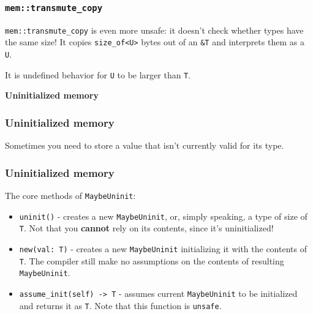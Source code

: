 \documentclass[aspectratio=1610,t]{beamer}
\begin{document}

\begin{frame}[fragile]
\frametitle{\texttt{mem::transmute\_copy}}
\texttt{mem::transmute\_copy} is even more unsafe: it doesn't check whether types have the same size! It copies \texttt{size\_of<U>} bytes out of an \texttt{\&T} and interprets them as a \texttt{U}.

It is undefined behavior for \texttt{U} to be larger than \texttt{T}.
\end{frame}


\begin{frame}[c]
\centering\Huge\textbf{Uninitialized memory}
\end{frame}


\begin{frame}[fragile]
\frametitle{Uninitialized memory}
Sometimes you need to store a value that isn't currently valid for its type.


\end{frame}


\begin{frame}[fragile]
\frametitle{Uninitialized memory}
The core methods of \texttt{MaybeUninit}:

\begin{itemize}
    \item \texttt{uninit()} - creates a new \texttt{MaybeUninit}, or, simply speaking, a type of size of \texttt{T}. Not that you \textbf{cannot} rely on its contents, since it's uninitialized!
    \item \texttt{new(val: T)} - creates a new \texttt{MaybeUninit} initializing it with the contents of \texttt{T}. The compiler still make no assumptions on the contents of resulting \texttt{MaybeUninit}.
    \item \texttt{assume\_init(self) -> T} - assumes current \texttt{MaybeUninit} to be initialized and returns it as \texttt{T}. Note that this function is \texttt{unsafe}.
\end{itemize}
\end{frame}
\end{document}
